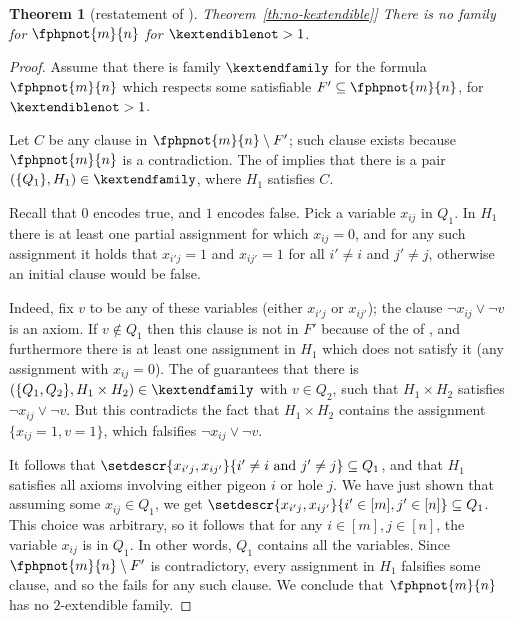 \documentclass[11pt]{article}
\numberwithin{equation}{section}
\newtheorem{theorem}{Theorem}[section]
\theoremstyle{definition}
\theoremstyle{plain}
\newcommand{\expref}[2]{\hyperref[#2]{#1~\ref{#2}}}
\begin{document}
\begin{theorem}[restatement of \expref{Theorem}{th:no-kextendible}]
  There is no \kextendible family for $\fphpnot{m}{n}$ for $\kextendiblenot > 1$.
\end{theorem}
\begin{proof}

  Assume that there is \akextendible family $\kextendfamily$ for
  the formula $\fphpnot{m}{n}$ which respects some satisfiable
  $F'\subseteq \fphpnot{m}{n}$, for $\kextendiblenot>1$.

  Let $C$ be any clause in $\fphpnot{m}{n}\setminus F'$; such clause exists because $\fphpnot{m}{n}$ is a contradiction.
  The \extensionproperty of \kextendfamily implies that there is a
  pair $(\{Q_{1}\}, H_{1} )\in\kextendfamily$, where $H_{1}$ satisfies $C$.

  Recall that $0$ encodes true, and $1$ encodes false. Pick a
  variable $x_{ij}$ in $Q_{1}$. In $H_{1}$ there is at least one
  partial assignment for which $x_{ij}=0$, and for any such assignment
  it holds that $x_{i'j}=1$ and $x_{ij'}=1$ for all $i'\not=i$ and
  $j'\not=j$, otherwise an initial clause would be false.

  Indeed, fix $v$ to be any of these variables (either $x_{i'j}$ or
  $x_{ij'}$); the clause $\lnot{x_{ij}} \lor \lnot{v}$ is an axiom.
  If $v \not\in Q_{1}$ then this clause is not in $F'$ because of the
  \respectfulness of \kextendfamily, and furthermore there is at
  least one assignment in $H_{1}$ which does not satisfy it (\ieComma any assignment with
  $x_{ij}=0$).
  The \extensionproperty of \kextendfamily guarantees that there is
  $(\{Q_{1},Q_{2}\},H_{1}\times H_{2}) \in \kextendfamily$ with $v\in
  Q_{2}$, such that $H_{1}\times H_{2}$ satisfies $\lnot{x_{ij}} \lor
  \lnot{v}$. But this contradicts the fact that $H_{1}\times H_{2}$
  contains the assignment $\{x_{ij}=1,v=1\}$, which falsifies
  $\lnot{x_{ij}} \lor \lnot{v}$.


  It follows that $\setdescr{x_{i'j},x_{ij'}}{i'\not=i \text{\ and\
    } j'\not=j} \subseteq Q_{1}$, and that $H_{1}$ satisfies all
  axioms involving either pigeon $i$ or hole $j$.
  We have just shown that assuming some $x_{ij}\in Q_{1}$, we get
  \mbox{$\setdescr{x_{i'j},x_{ij'}}{i'\in[m], j'\in[n]}\subseteq
    Q_{1}$}. This choice was arbitrary, so it follows that for any
  $i\in[m], j\in[n]$, the variable $x_{ij}$ is in $Q_{1}$. In other
  words, $Q_1$ contains all the variables. Since
  $\fphpnot{m}{n}\setminus F'$ is contradictory, every assignment in
  $H_1$ falsifies some clause, and so the \extensionproperty fails for
  any such clause.  We conclude that $\fphpnot{m}{n}$ has no
  $2$-extendible family.
  \end{proof}
\end{document}
